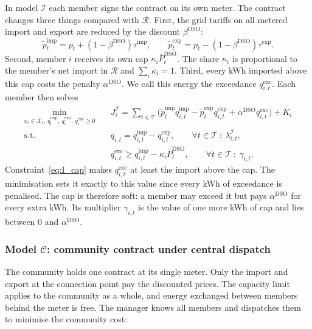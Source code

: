 In model $\mathcal{I}$ each member signs the contract on its own meter.
The contract changes three things compared with $\mathcal{R}$.
First, the grid tariffs on all metered import and export are reduced by the discount $\beta^{\mathrm{DSO}}$:
\begin{equation}\label{eq:ptilde}
\tilde{p}^{\mathrm{imp}}_t=p_t+(1-\beta^{\mathrm{DSO}})\tau^{\mathrm{imp}},\qquad
\tilde{p}^{\mathrm{exp}}_t=p_t-(1-\beta^{\mathrm{DSO}})\tau^{\mathrm{exp}}.
\end{equation}
Second, member $i$ receives its own cap $\kappa_i\overline{P}^{\mathrm{DSO}}_t$.
The share $\kappa_i$ is proportional to the member's net import in $\mathcal{R}$ and $\sum_i\kappa_i=1$.
Third, every kWh imported above this cap costs the penalty $\alpha^{\mathrm{DSO}}$.
We call this energy the exceedance $q^{\mathrm{exc}}_{i,t}$.
Each member then solves
\begin{subequations}\label{eq:I}
\begin{align}
\min_{x_i\in\mathcal{X}_i,\ q^{\mathrm{imp}}_{i},\ q^{\mathrm{exp}}_{i},\ q^{\mathrm{exc}}_{i}\ge 0}\quad & J^{\mathcal{I}}_i=\sum_{t\in\mathcal{T}}\Big(\tilde{p}^{\mathrm{imp}}_t q^{\mathrm{imp}}_{i,t}-\tilde{p}^{\mathrm{exp}}_t q^{\mathrm{exp}}_{i,t}+\alpha^{\mathrm{DSO}}q^{\mathrm{exc}}_{i,t}\Big)+K_i \label{eq:I_obj}\\
\text{s.t.}\quad & q_{i,t}=q^{\mathrm{imp}}_{i,t}-q^{\mathrm{exp}}_{i,t}, \qquad \forall t\in\mathcal{T}\ :\ \lambda^{\mathcal{I}}_{i,t}, \label{eq:I_bal}\\
& q^{\mathrm{exc}}_{i,t}\ge q^{\mathrm{imp}}_{i,t}-\kappa_i\overline{P}^{\mathrm{DSO}}_t, \qquad \forall t\in\mathcal{T}\ :\ \gamma_{i,t}. \label{eq:I_cap}
\end{align}
\end{subequations}
Constraint~\eqref{eq:I_cap} makes $q^{\mathrm{exc}}_{i,t}$ at least the import above the cap.
The minimisation sets it exactly to this value since every kWh of exceedance is penalised.
The cap is therefore soft: a member may exceed it but pays $\alpha^{\mathrm{DSO}}$ for every extra kWh.
Its multiplier $\gamma_{i,t}$ is the value of one more kWh of cap and lies between $0$ and $\alpha^{\mathrm{DSO}}$.



\subsubsection{Model $\mathcal{C}$: community contract under central dispatch}
The community holds one contract at its single meter.
Only the import and export at the connection point pay the discounted prices. The capacity limit applies to the community as a whole, and energy exchanged between members behind the meter is free. The manager knows all members and dispatches them to minimise the community cost:

